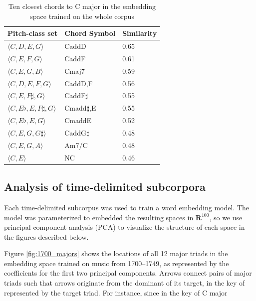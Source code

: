 \begin{table}

 \begin{center}
 \begin{tabular}{|l|l|l|}

  \hline
  Pitch-class set & Chord Symbol & Similarity  \\
\hline
\hline
$\langle C, D, E, G \rangle$ & CaddD & 0.65 \\
\hline
$\langle C, E, F, G \rangle$ & CaddF & 0.61 \\
\hline
$\langle C, E, G, B \rangle$ & Cmaj7 & 0.59 \\
\hline
$\langle C, D, E, F, G \rangle$ & CaddD,F & 0.56 \\
\hline
$\langle C, E, F\sharp, G \rangle$ & CaddF$\sharp$ & 0.55 \\
\hline
$\langle C, E\flat, E, F\sharp, G \rangle$ & Cmadd$\sharp$,E & 0.55 \\
\hline
$\langle C, E\flat, E, G \rangle$ & CmaddE & 0.52 \\
\hline
$\langle C, E, G, G\sharp \rangle$ & CaddG$\sharp$ & 0.48 \\
\hline
$\langle C, E, G, A \rangle$ & Am7/C & 0.48 \\
\hline
$\langle C, E \rangle$ & NC & 0.46 \\
\hline



\end{tabular}
\end{center}

 \caption{Ten closest chords to C major in the embedding space trained on the whole corpus}
 \label{tab:close_to_c}
\end{table}

\subsection{Analysis of time-delimited subcorpora}
Each time-delimited subcorpus was used to train a word embedding model. The model was parameterized to embedded the resulting spaces in $\mathbf{R}^{100}$, so we use principal component analysis (PCA) to visualize the structure of each space in the figures described below.

Figure \ref{fig:1700_majors} shows the locations of all 12 major triads in the embedding space trained on music from 1700--1749, as represented by the coefficients for the first two principal components. Arrows connect pairs of major triads such that arrows originate from the dominant of its target, in the key of represented by the target triad. For instance, since in the key of C major

